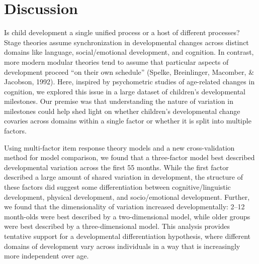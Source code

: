 \documentclass[10pt, letterpaper]{article}
\begin{document}
\hypertarget{discussion}{%
\section{Discussion}\label{discussion}}

Is child development a single unified process or a host of different
processes? Stage theories assume synchronization in developmental
changes across distinct domains like language, social/emotional
development, and cognition. In contrast, more modern modular theories
tend to assume that particular aspects of development proceed ``on their
own schedule'' (Spelke, Breinlinger, Macomber, \& Jacobson, 1992). Here,
inspired by psychometric studies of age-related changes in cognition, we
explored this issue in a large dataset of children's developmental
milestones. Our premise was that understanding the nature of variation
in milestones could help shed light on whether children's developmental
change covaries across domains within a single factor or whether it is
split into multiple factors.

Using multi-factor item response theory models and a new
cross-validation method for model comparison, we found that a
three-factor model best described developmental variation across the
first 55 months. While the first factor described a large amount of
shared variation in development, the structure of these factors did
suggest some differentiation between cognitive/linguistic development,
physical development, and socio/emotional development. Further, we found
that the dimensionality of variation increased developmentally: 2--12
month-olds were best described by a two-dimensional model, while older
groups were best described by a three-dimensional model. This analysis
provides tentative support for a developmental differentiation
hypothesis, where different domains of development vary across
individuals in a way that is increasingly more independent over age.
\end{document}
